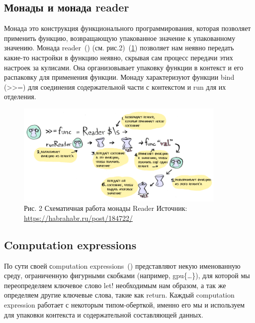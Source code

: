\documentclass[14pt]{matmex-diploma}
\begin{document}
\subsection {Монады и монада reader}
Монада это конструкция функционального программирования, которая позволяет применить функцию, возвращающую упакованное значение к упакованному значению.
Монада reader~(\cite{habrahabr}) (см. рис.2)~(\ref{reader}) позволяет нам неявно передать какие-то настройки в функцию неявно, скрывая сам процесс передачи этих настроек за кулисами. Она организовывает упаковку функции в контекст и его распаковку для применения функции. Монаду характеризуют функции bind (>>=) для соединения содержательной части с контекстом и run для их отделения.
\begin{figure}[h] 
\label{reader}
\centering 
\includegraphics[width=0.9\textwidth]{images/reader} 
\caption{Рис. 2 Схематичная работа монады Reader
Источник: \url{https://habrahabr.ru/post/184722/}
} 
\end{figure}
\subsection{Computation expressions}
По сути своей сomputation expressions~(\cite{fsffap}) представляют некую именованную среду, ограниченную фигурными скобками (например, gpu\{\ldots\}), для которой мы переопределяем ключевое слово let! необходимым нам образом, а так же определяем другие ключевые слова, такие как return. 
Каждый computation expression работает с некоторым типом-оберткой, именно его мы и используем для упаковки контекста и содержательной составляющей данных.
\end{document}
